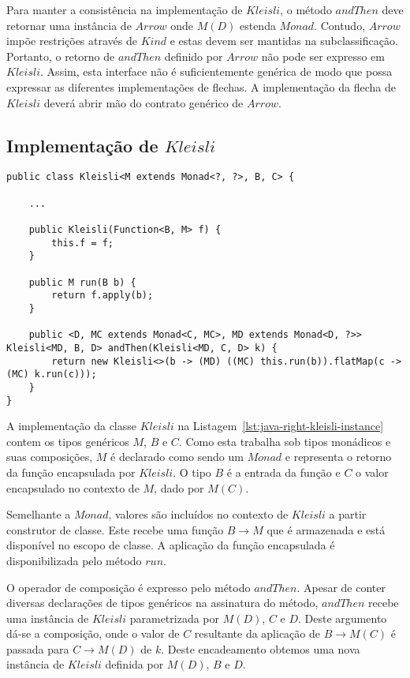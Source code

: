 \documentclass[10pt, conference]{IEEEtran}
\begin{document}
Para manter a consistência na implementação de $Kleisli$, o método $andThen$ deve retornar uma instância de $Arrow$ onde $M(D)$ estenda $Monad$. Contudo, $Arrow$ impõe restrições através de $Kind$ e estas devem ser mantidas na subclassificação. Portanto, o retorno de $andThen$ definido por $Arrow$ não pode ser expresso em $Kleisli$. Assim, esta interface não é suficientemente genérica de modo que possa expressar as diferentes implementações de flechas. A implementação da flecha de $Kleisli$ deverá abrir mão do contrato genérico de $Arrow$.

\subsection{Implementação de $Kleisli$}

\begin{lstlisting}[float = *, caption = {Implementação de $Kleisli$}, label = {lst:java-right-kleisli-instance}]
public class Kleisli<M extends Monad<?, ?>, B, C> {

	...

	public Kleisli(Function<B, M> f) {
		this.f = f;
	}

	public M run(B b) {
		return f.apply(b);
	}

	public <D, MC extends Monad<C, MC>, MD extends Monad<D, ?>> Kleisli<MD, B, D> andThen(Kleisli<MD, C, D> k) {
		return new Kleisli<>(b -> (MD) ((MC) this.run(b)).flatMap(c -> (MC) k.run(c)));
	}
}
\end{lstlisting}

A implementação da classe $Kleisli$ na Listagem~\ref{lst:java-right-kleisli-instance} contem os tipos genéricos $M$, $B$ e $C$. Como esta trabalha sob tipos monádicos e suas composições, $M$ é declarado como sendo um $Monad$ e representa o retorno da função encapsulada por $Kleisli$. O tipo $B$ é a entrada da função e $C$ o valor encapsulado no contexto de $M$, dado por $M(C)$.

Semelhante a $Monad$, valores são incluídos no contexto de $Kleisli$ a partir construtor de classe. Este recebe uma função $B \rightarrow M$ que é armazenada e está disponível no escopo de classe. A aplicação da função encapsulada é disponibilizada pelo método $run$.

O operador de composição é expresso pelo método $andThen$. Apesar de conter diversas declarações de tipos genéricos na assinatura do método, $andThen$ recebe uma instância de $Kleisli$ parametrizada por $M(D)$, $C$ e $D$. Deste argumento dá-se a composição, onde o valor de $C$ resultante da aplicação de $B \rightarrow M(C)$ é passada para $C \rightarrow M(D)$ de $k$. Deste encadeamento obtemos uma nova instância de $Kleisli$ definida por $M(D)$, $B$ e $D$.
\end{document}
